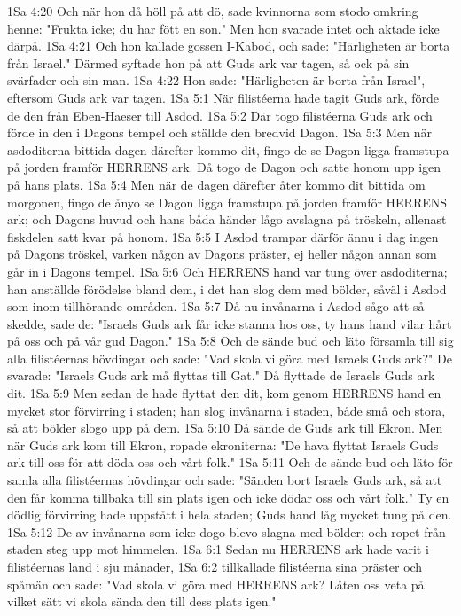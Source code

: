 1Sa 4:20  Och när hon då höll på att dö, sade kvinnorna som stodo omkring henne: "Frukta icke; du har fött en son." Men hon svarade intet och aktade icke därpå.
1Sa 4:21  Och hon kallade gossen I-Kabod, och sade: "Härligheten är borta från Israel." Därmed syftade hon på att Guds ark var tagen, så ock på sin svärfader och sin man.
1Sa 4:22  Hon sade: "Härligheten är borta från Israel", eftersom Guds ark var tagen.
1Sa 5:1  När filistéerna hade tagit Guds ark, förde de den från Eben-Haeser till Asdod.
1Sa 5:2  Där togo filistéerna Guds ark och förde in den i Dagons tempel och ställde den bredvid Dagon.
1Sa 5:3  Men när asdoditerna bittida dagen därefter kommo dit, fingo de se Dagon ligga framstupa på jorden framför HERRENS ark. Då togo de Dagon och satte honom upp igen på hans plats.
1Sa 5:4  Men när de dagen därefter åter kommo dit bittida om morgonen, fingo de ånyo se Dagon ligga framstupa på jorden framför HERRENS ark; och Dagons huvud och hans båda händer lågo avslagna på tröskeln, allenast fiskdelen satt kvar på honom.
1Sa 5:5  I Asdod trampar därför ännu i dag ingen på Dagons tröskel, varken någon av Dagons präster, ej heller någon annan som går in i Dagons tempel.
1Sa 5:6  Och HERRENS hand var tung över asdoditerna; han anställde förödelse bland dem, i det han slog dem med bölder, såväl i Asdod som inom tillhörande områden.
1Sa 5:7  Då nu invånarna i Asdod sågo att så skedde, sade de: "Israels Guds ark får icke stanna hos oss, ty hans hand vilar hårt på oss och på vår gud Dagon."
1Sa 5:8  Och de sände bud och läto församla till sig alla filistéernas hövdingar och sade: "Vad skola vi göra med Israels Guds ark?" De svarade: "Israels Guds ark må flyttas till Gat." Då flyttade de Israels Guds ark dit.
1Sa 5:9  Men sedan de hade flyttat den dit, kom genom HERRENS hand en mycket stor förvirring i staden; han slog invånarna i staden, både små och stora, så att bölder slogo upp på dem.
1Sa 5:10  Då sände de Guds ark till Ekron. Men när Guds ark kom till Ekron, ropade ekroniterna: "De hava flyttat Israels Guds ark till oss för att döda oss och vårt folk."
1Sa 5:11  Och de sände bud och läto för samla alla filistéernas hövdingar och sade: "Sänden bort Israels Guds ark, så att den får komma tillbaka till sin plats igen och icke dödar oss och vårt folk." Ty en dödlig förvirring hade uppstått i hela staden; Guds hand låg mycket tung på den.
1Sa 5:12  De av invånarna som icke dogo blevo slagna med bölder; och ropet från staden steg upp mot himmelen.
1Sa 6:1  Sedan nu HERRENS ark hade varit i filistéernas land i sju månader,
1Sa 6:2  tillkallade filistéerna sina präster och spåmän och sade: "Vad skola vi göra med HERRENS ark? Låten oss veta på vilket sätt vi skola sända den till dess plats igen."
